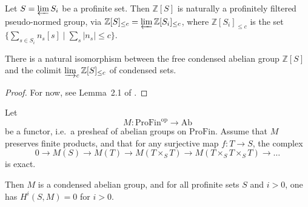 \begin{lemma}
  \label{free-png}
  \leanok
  Let $S = \varprojlim S_i$ be a profinite set.
  Then $\mathbb Z[S]$ is naturally a profinitely filtered pseudo-normed group,
  via $\mathbb Z[S]_{\le c} = \varprojlim \mathbb Z[S_i]_{\le c}$,
  where $\mathbb Z[S_i]_{\le c}$ is the set $\{\sum_{s \in S_i} n_s[s] \mid \sum_s |n_s| \le c\}$.

  There is a natural isomorphism between the free condensed abelian group $\mathbb Z[S]$
  and the colimit $\varinjlim_c \mathbb Z[S]_{\le c}$ of condensed sets.
\end{lemma}

\begin{proof}
  \leanok
  For now, see Lemma~2.1 of \cite{Analytic}.
\end{proof}

\begin{proposition}
  \label{acyclic-sheaf}
  \leanok
  Let
  \[ M \colon \mathrm{ProFin}^{\mathrm{op}}\longrightarrow \mathrm{Ab} \]
  be a functor, i.e.~a presheaf of abelian groups on $\mathrm{ProFin}$. Assume that $M$ preserves finite products, and that for any surjective map $f: T\to S$, the complex
  \[ 0\longrightarrow M(S)\longrightarrow M(T)\longrightarrow M(T\times_S T)\longrightarrow M(T\times_S T\times_S T)\longrightarrow \ldots \]
  is exact.

  Then $M$ is a condensed abelian group, and for all profinite sets $S$ and $i>0$, one has $H^i(S,M)=0$ for $i>0$.
\end{proposition}

